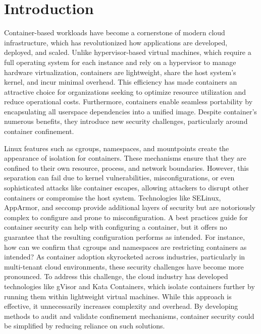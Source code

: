 \section{Introduction}

Container-based workloads have become a cornerstone of modern cloud infrastructure, which has revolutionized how applications are developed, deployed, and scaled. Unlike hypervisor-based virtual machines, which require a full operating system for each instance and rely on a hypervisor to manage hardware virtualization, containers are lightweight, share the host system’s kernel, and incur minimal overhead. This efficiency has made containers an attractive choice for organizations seeking to optimize resource utilization and reduce operational costs. Furthermore, containers enable seamless portability by encapsulating all userspace dependencies into a unified image. Despite container's numerous benefits, they introduce new security challenges, particularly around container confinement. 

Linux features such as cgroups, namespaces, and mountpoints create the appearance of isolation for containers. These mechanisms ensure that they are confined to their own resource, process, and network boundaries. However, this separation can fail due to kernel vulnerabilities, misconfigurations, or even sophisticated attacks like container escapes, allowing attackers to disrupt other containers or compromise the host system. Technologies like SELinux, AppArmor, and seccomp provide additional layers of security but are notoriously complex to configure and prone to misconfiguration. A best practices guide for container security  \cite{CIS} can help with configuring a container, but it offers no guarantee that the resulting configuration performs as intended. For instance, how can we confirm that cgroups and namespaces are restricting containers as intended? As container adoption skyrocketed across industries, particularly in multi-tenant cloud environments, these security challenges have become more pronounced. To address this challenge, the cloud industry has developed technologies like gVisor and Kata Containers, which isolate containers further by running them within lightweight virtual machines. While this approach is effective, it unnecessarily increases complexity and overhead. By developing methods to audit and validate confinement mechanisms, container security could be simplified by reducing reliance on such solutions.

